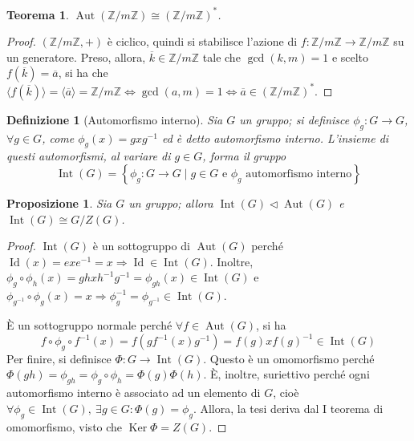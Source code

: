 \documentclass[12pt]{scrartcl}
\theoremstyle{style}
\newtheorem{definizione}{Definizione}[section]
\newtheorem{prop}{Proposizione}[section]
\newtheorem{teorema}{Teorema}[section]
\numberwithin{equation}{subsection}
\begin{document}
\begin{teorema}
$\operatorname{Aut} (\mathbb{Z} / m \mathbb{Z}) \cong (\mathbb{Z} / m \mathbb{Z})^*$.
\end{teorema}
\begin{proof}
	$(\mathbb{Z} / m\mathbb{Z}, + )$ \`e ciclico, quindi si stabilisce l'azione di $f:\mathbb{Z} / m\mathbb{Z}\to \mathbb{Z}/ m\mathbb{Z}$ su un generatore.
	Preso, allora, $\overline{k} \in \mathbb{Z} / m\mathbb{Z} $ tale che $\operatorname{gcd}(k,m) =1$ e scelto $f(\overline{k}) = \overline{a}$, si ha che $\langle f(\overline{k}) \rangle= \langle \overline{a} \rangle= \mathbb{Z} / m\mathbb{Z} \iff \operatorname{gcd}(a,m) =1	\iff \overline{a} \in \left(\mathbb{Z} / m\mathbb{Z}\right) ^* $.
\end{proof}
\begin{definizione}
	[Automorfismo interno]
	Sia $G$ un gruppo; si definisce $\phi _g :G\to G$, $ \forall g \in G$, come $\phi_g (x) =gxg^{-1} $ ed \`e detto \textit{automorfismo interno}. 
	L'insieme di questi automorfismi, al variare di $g \in G$, forma il gruppo
	\[
	\operatorname{Int} (G) = \left\{ \phi _g : G\to G  \mid g \in G \text{ e } \phi _g \text{ automorfismo interno} \right\} 
	\] 
\end{definizione}
\begin{prop}\label{intcar}
	Sia $G$ un gruppo; allora $\operatorname{Int} (G) \lhd \operatorname{Aut} (G)$ e $\operatorname{Int} (G) \cong G / Z(G)$.
\end{prop}
	\begin{proof}
		$\operatorname{Int} (G)$ \`e un sottogruppo di $\operatorname{Aut} (G)$ perch\'e $\operatorname{Id} (x) = exe^{-1} = x  \Rightarrow \operatorname{Id} \in \operatorname{Int} (G)$.
		Inoltre, $\phi _g \circ \phi _h (x) = ghxh^{-1}g^{-1}=\phi _{gh} (x) \in \operatorname{Int} (G)$ e $\phi _{g^{-1} } \circ \phi _g (x) = x \Rightarrow \phi _g^{-1} = \phi _{g^{-1}} \in \operatorname{Int}(G)  $.

		\`E un sottogruppo normale perch\'e $\forall f \in \operatorname{Aut} (G)$, si ha 
		\[
		f \circ \phi _g \circ f^{-1}(x) = f \left(g f^{-1}(x) g^{-1}\right) =f(g) x f(g)^{-1} \in \operatorname{Int} (G)
		\] 
		Per finire, si definisce $\Phi : G \to \operatorname{Int} (G) $.
		Questo \`e un omomorfismo perch\'e $\Phi(gh)=\phi _{gh} = \phi _g\circ \phi _h = \Phi(g)\Phi(h)$.
		\`E, inoltre, suriettivo perch\'e ogni automorfismo interno \`e associato ad un elemento di $G$, cio\`e $\forall \phi _g \in \operatorname{Int} (G), \ \exists g \in G : \Phi(g) = \phi _g$.
		Allora, la tesi deriva dal I teorema di omomorfismo, visto che $\operatorname{Ker} \Phi = Z(G)$.
	\end{proof}
\end{document}
